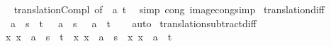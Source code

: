 \begin{isabellebody}
%
\isadelimproof
\ \ %
\endisadelimproof
%
\isatagproof
{}\isamarkupfalse%
\ translation{\isacharunderscore}{\kern0pt}Compl\ {\isacharbrackleft}{\kern0pt}of\ {\isachardoublequoteopen}{\isacharminus}{\kern0pt}\ a{\isachardoublequoteclose}\ t{\isacharbrackright}{\kern0pt}\ \isamarkupfalse%
\ {\isacharparenleft}{\kern0pt}simp\ cong{\isacharcolon}{\kern0pt}\ image{\isacharunderscore}{\kern0pt}cong{\isacharunderscore}{\kern0pt}simp{\isacharparenright}{\kern0pt}%
\endisatagproof
{\isafoldproof}%
%
\isadelimproof
\isanewline
%
\endisadelimproof
\isanewline
{}\isamarkupfalse%
\ translation{\isacharunderscore}{\kern0pt}diff{\isacharcolon}{\kern0pt}\isanewline
\ \ {\isachardoublequoteopen}{\isacharparenleft}{\kern0pt}{\isacharplus}{\kern0pt}{\isacharparenright}{\kern0pt}\ a\ {\isacharbackquote}{\kern0pt}\ {\isacharparenleft}{\kern0pt}s\ {\isacharminus}{\kern0pt}\ t{\isacharparenright}{\kern0pt}\ {\isacharequal}{\kern0pt}\ {\isacharparenleft}{\kern0pt}{\isacharparenleft}{\kern0pt}{\isacharplus}{\kern0pt}{\isacharparenright}{\kern0pt}\ a\ {\isacharbackquote}{\kern0pt}\ s{\isacharparenright}{\kern0pt}\ {\isacharminus}{\kern0pt}\ {\isacharparenleft}{\kern0pt}{\isacharparenleft}{\kern0pt}{\isacharplus}{\kern0pt}{\isacharparenright}{\kern0pt}\ a\ {\isacharbackquote}{\kern0pt}\ t{\isacharparenright}{\kern0pt}{\isachardoublequoteclose}\isanewline
%
\isadelimproof
\ \ %
\endisadelimproof
%
\isatagproof
{}\isamarkupfalse%
\ auto%
\endisatagproof
{\isafoldproof}%
%
\isadelimproof
\isanewline
%
\endisadelimproof
\isanewline
{}\isamarkupfalse%
\ translation{\isacharunderscore}{\kern0pt}subtract{\isacharunderscore}{\kern0pt}diff{\isacharcolon}{\kern0pt}\isanewline
\ \ {\isachardoublequoteopen}{\isacharparenleft}{\kern0pt}{\isasymlambda}x{\isachardot}{\kern0pt}\ x\ {\isacharminus}{\kern0pt}\ a{\isacharparenright}{\kern0pt}\ {\isacharbackquote}{\kern0pt}\ {\isacharparenleft}{\kern0pt}s\ {\isacharminus}{\kern0pt}\ t{\isacharparenright}{\kern0pt}\ {\isacharequal}{\kern0pt}\ {\isacharparenleft}{\kern0pt}{\isacharparenleft}{\kern0pt}{\isasymlambda}x{\isachardot}{\kern0pt}\ x\ {\isacharminus}{\kern0pt}\ a{\isacharparenright}{\kern0pt}\ {\isacharbackquote}{\kern0pt}\ s{\isacharparenright}{\kern0pt}\ {\isacharminus}{\kern0pt}\ {\isacharparenleft}{\kern0pt}{\isacharparenleft}{\kern0pt}{\isasymlambda}x{\isachardot}{\kern0pt}\ x\ {\isacharminus}{\kern0pt}\ a{\isacharparenright}{\kern0pt}\ {\isacharbackquote}{\kern0pt}\ t{\isacharparenright}{\kern0pt}{\isachardoublequoteclose}\isanewline
%
\isadelimproof
\ \ %
\endisadelimproof

\end{isabellebody}
